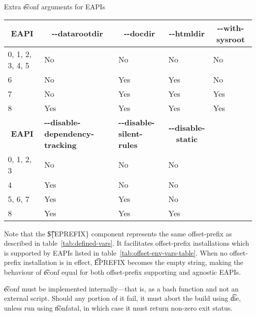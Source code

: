 \begin{description}
    \begin{centertable}{Extra \t{econf} arguments for EAPIs}
        \label{tab:econf-options-table}
        \begin{tabular}{lllll}
          \toprule
          \multicolumn{1}{c}{\textbf{EAPI}} &
          \multicolumn{1}{c}{\textbf{-{}-datarootdir}} &
          \multicolumn{1}{c}{\textbf{-{}-docdir}} &
          \multicolumn{1}{c}{\textbf{-{}-htmldir}} &
          \multicolumn{1}{c}{\textbf{-{}-with-sysroot}} \\
          \midrule
          0, 1, 2, 3, 4, 5  & No  & No  & No  & No  \\
          6                 & No  & Yes & Yes & No  \\
          7                 & No  & Yes & Yes & Yes \\
          8                 & Yes & Yes & Yes & Yes \\
          \midrule
          \multicolumn{1}{c}{\textbf{EAPI}} &
          \multicolumn{1}{P{5.5em}}{\textbf{-{}-disable-dependency-tracking}} &
          \multicolumn{1}{P{5em}}{\textbf{-{}-disable-silent-rules}} &
          \multicolumn{1}{c}{\textbf{-{}-disable-static}} & \\
          \midrule
          0, 1, 2, 3        & No  & No  & No  & \\
          4                 & Yes & No  & No  & \\
          5, 6, 7           & Yes & Yes & No  & \\
          8                 & Yes & Yes & Yes & \\
          \bottomrule
        \end{tabular}
    \end{centertable}

    Note that the \t{\$\{EPREFIX\}} component represents the same offset-prefix as described in
    table~\ref{tab:defined-vars}. It facilitates offset-prefix installations which is supported by
    EAPIs listed in table~\ref{tab:offset-env-vars-table}. When no offset-prefix installation is in
    effect, \t{EPREFIX} becomes the empty string, making the behaviour of \t{econf} equal for both
    offset-prefix supporting and agnostic EAPIs.

    \t{econf} must be implemented internally---that is, as a bash function and not an external
    script. Should any portion of it fail, it must abort the build using \t{die}, unless run using
    \t{nonfatal}, in which case it must return non-zero exit status.


\end{description}
